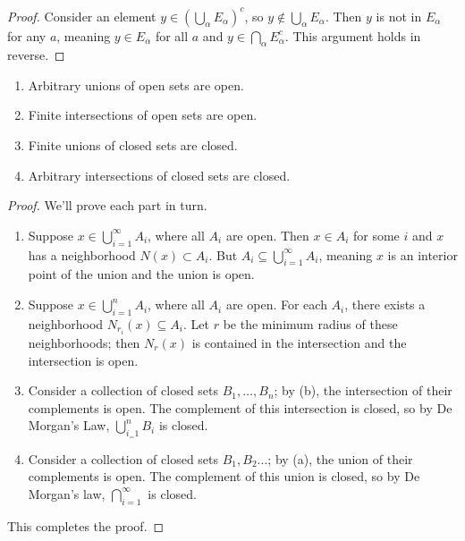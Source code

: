 \documentclass[../m131main.tex]{subfiles}
\begin{document}
\begin{proof}
    Consider an element $y \in \left( \bigcup_\alpha E_\alpha \right)^{c}$, so $y \not\in \bigcup_\alpha E_\alpha$.
    Then $y$ is not in $E_\alpha$ for any $a$, meaning $y \in E_\alpha$ for all $a$ and $y \in \bigcap_\alpha E_\alpha^c$.
    This argument holds in reverse.
\end{proof}

\begin{theorem}
    \begin{enumerate}[label=(\alph*)]
        \item Arbitrary unions of open sets are open.
        \item Finite intersections of open sets are open.
        \item Finite unions of closed sets are closed.
        \item Arbitrary intersections of closed sets are closed.
    \end{enumerate}
\end{theorem}

\begin{proof}
    We'll prove each part in turn.
    \begin{enumerate}[label=(\alph*)]
        \item Suppose $x \in \bigcup_{i=1}^\infty A_i$, where all $A_i$ are open.
        Then $x \in A_i$ for some $i$ and $x$ has a neighborhood $N(x) \subset A_i$.
        But $A_i \subseteq \bigcup_{i=1}^\infty A_i$, meaning $x$ is an interior point of the union and the union is open.

        \item Suppose $x \in \bigcup_{i=1}^n A_i$, where all $A_i$ are open.
        For each $A_i$, there exists a neighborhood $N_{r_i}(x) \subseteq A_i$.
        Let $r$ be the minimum radius of these neighborhoods; then $N_r(x)$ is contained in the intersection and the intersection is open.

        \item Consider a collection of closed sets $B_1, \ldots, B_n$; by (b), the intersection of their complements is open.
        The complement of this intersection is closed, so by De Morgan's Law, $\bigcup_{i_=1}^n B_i$ is closed.

        \item Consider a collection of closed sets $B_1, B_2 \ldots$; by (a), the union of their complements is open.
        The complement of this union is closed, so by De Morgan's law, $\bigcap_{i=1}^\infty$ is closed.
    \end{enumerate}
    This completes the proof.
\end{proof}
\end{document}
